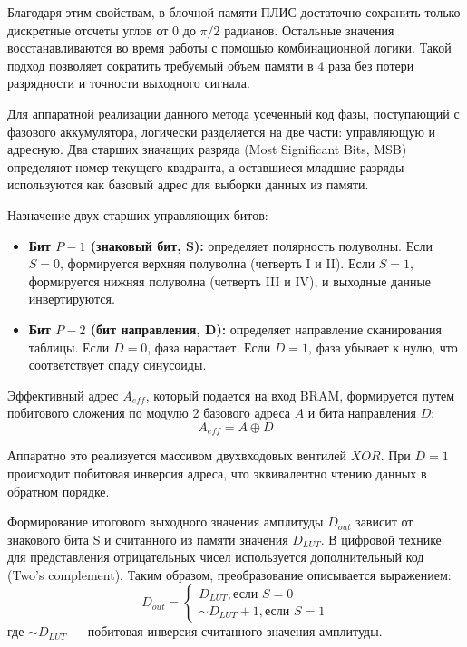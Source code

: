 \documentclass[12pt,a4paper,TimesNewRoman]{article}
\begin{document}
Благодаря этим свойствам, в блочной памяти ПЛИС достаточно сохранить только дискретные отсчеты углов от $0$ до $\pi/2$ радианов. Остальные значения восстанавливаются во время работы с помощью комбинационной логики. Такой подход позволяет сократить требуемый объем памяти в 4 раза без потери разрядности и точности выходного сигнала.

Для аппаратной реализации данного метода усеченный код фазы, поступающий с фазового аккумулятора, логически разделяется на две части: управляющую и адресную. Два старших значащих разряда (Most Significant Bits, MSB) определяют номер текущего квадранта, а оставшиеся младшие разряды используются как базовый адрес для выборки данных из памяти.

Назначение двух старших управляющих битов:

\begin{itemize}
    \item \textbf{Бит $P-1$ (знаковый бит, S):} определяет полярность полуволны. Если $S=0$, формируется верхняя полуволна (четверть I и II). Если $S=1$, формируется нижняя полуволна (четверть III и IV), и выходные данные инвертируются.
    \item \textbf{Бит $P-2$ (бит направления, D):} определяет направление сканирования таблицы. Если $D=0$, фаза нарастает. Если $D=1$, фаза убывает к нулю, что соответствует спаду синусоиды.
\end{itemize}

Эффективный адрес $A_{eff}$, который подается на вход BRAM, формируется путем побитового сложения по модулю 2 базового адреса $A$ и бита направления $D$:
\begin{equation} \label{eq:qws_addr}
    A_{eff} = A \oplus D
\end{equation}

Аппаратно это реализуется массивом двухвходовых вентилей $XOR$. При $D=1$ происходит побитовая инверсия адреса, что эквивалентно чтению данных в обратном порядке.

Формирование итогового выходного значения амплитуды $D_{out}$ зависит от знакового бита S и считанного из памяти значения $D_{LUT}$. В цифровой технике для представления отрицательных чисел используется дополнительный код (Two's complement). Таким образом, преобразование описывается выражением:
\begin{equation} \label{eq:qws_data}
D_{out} =
\begin{cases}
D_{LUT}, \text{если } S = 0 \\
\sim D_{LUT} + 1, \text{если } S = 1
\end{cases}
\end{equation}
где $\sim D_{LUT}$ — побитовая инверсия считанного значения амплитуды.
\end{document}
